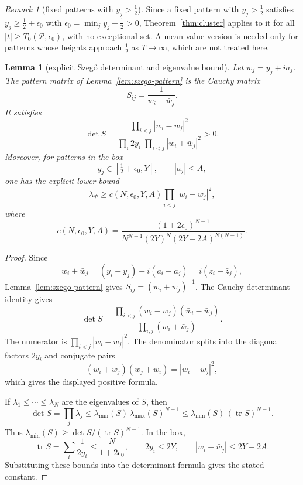 \documentclass[11pt]{amsart}
\newtheorem{lemma}[theorem]{Lemma}
\theoremstyle{definition}
\theoremstyle{remark}
\newtheorem{remark}[theorem]{Remark}
\theoremstyle{definition}
\newcommand{\half}{\tfrac{1}{2}}
\begin{document}
\begin{remark}[fixed patterns with $y_j>\half$]\label{rmk:cluster-fixed}
Since a fixed pattern with $y_j>\half$ satisfies $y_j\ge\half+\epsilon_0$ with
$\epsilon_0=\min_j y_j-\half>0$, Theorem~\ref{thm:cluster} applies to it for all
$|t|\ge T_0(\mathcal P,\epsilon_0)$, with no exceptional set.  A mean-value version is needed only for
patterns whose heights approach $\half$ as $T\to\infty$, which are not treated here.
\end{remark}

\begin{lemma}[explicit Szeg\H{o} determinant and eigenvalue bound]\label{lem:szego-explicit}
Let $w_j=y_j+ia_j$.  The pattern matrix of Lemma~\ref{lem:szego-pattern} is the Cauchy matrix
\[
   S_{ij}=\frac{1}{w_i+\bar w_j}.
\]
It satisfies
\[
   \det S
   =
   \frac{\prod_{i<j}|w_i-w_j|^2}
        {\prod_i 2y_i\;\prod_{i<j}|w_i+\bar w_j|^2}
   >0.
\]
Moreover, for patterns in the box
\[
   y_j\in[\half+\epsilon_0,Y],\qquad |a_j|\le A,
\]
one has the explicit lower bound
\[
   \lambda_{\mathcal P}
   \ge
   c(N,\epsilon_0,Y,A)\prod_{i<j}|w_i-w_j|^2,
\]
where
\[
   c(N,\epsilon_0,Y,A)
   =
   \frac{(1+2\epsilon_0)^{N-1}}
        {N^{N-1}(2Y)^N(2Y+2A)^{N(N-1)}}.
\]
\end{lemma}

\begin{proof}
Since
\[
   w_i+\bar w_j=(y_i+y_j)+i(a_i-a_j)=i(z_i-\bar z_j),
\]
Lemma~\ref{lem:szego-pattern} gives $S_{ij}=(w_i+\bar w_j)^{-1}$.  The Cauchy determinant identity
gives
\[
   \det S
   =
   \frac{\prod_{i<j}(w_i-w_j)(\bar w_i-\bar w_j)}
        {\prod_{i,j}(w_i+\bar w_j)}.
\]
The numerator is $\prod_{i<j}|w_i-w_j|^2$.  The denominator splits into the diagonal factors
$2y_i$ and conjugate pairs
\[
   (w_i+\bar w_j)(w_j+\bar w_i)=|w_i+\bar w_j|^2,
\]
which gives the displayed positive formula.

If $\lambda_1\le\cdots\le\lambda_N$ are the eigenvalues of $S$, then
\[
   \det S=\prod_j\lambda_j
   \le
   \lambda_{\min}(S)\,\lambda_{\max}(S)^{N-1}
   \le
   \lambda_{\min}(S)\,(\operatorname{tr}S)^{N-1}.
\]
Thus $\lambda_{\min}(S)\ge\det S/(\operatorname{tr}S)^{N-1}$.  In the box,
\[
   \operatorname{tr}S=\sum_i\frac1{2y_i}\le\frac{N}{1+2\epsilon_0},\qquad
   2y_i\le2Y,\qquad
   |w_i+\bar w_j|\le2Y+2A.
\]
Substituting these bounds into the determinant formula gives the stated constant.
\end{proof}
\end{document}
